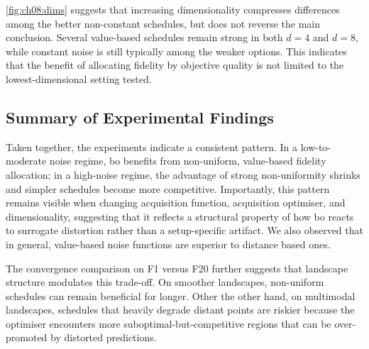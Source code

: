 \cref{fig:ch08:dims} suggests that increasing dimensionality compresses differences among the better non-constant schedules, but does not reverse the main conclusion. Several value-based schedules remain strong in both $d=4$ and $d=8$, while constant noise is still typically among the weaker options. This indicates that the benefit of allocating fidelity by objective quality is not limited to the lowest-dimensional setting tested.

\subsection{Summary of Experimental Findings}
Taken together, the experiments indicate a consistent pattern. In a low-to-moderate noise regime, \gls{bo} benefits from non-uniform, value-based fidelity allocation; in a high-noise regime, the advantage of strong non-uniformity shrinks and simpler schedules become more competitive. Importantly, this pattern remains visible when changing acquisition function, acquisition optimiser, and dimensionality, suggesting that it reflects a structural property of how \gls{bo} reacts to surrogate distortion rather than a setup-specific artifact.
We also observed that in general, value-based noise functions are superior to distance based ones.

The convergence comparison on F1 versus F20 further suggests that landscape structure modulates this trade-off. On smoother landscapes, non-uniform schedules can remain beneficial for longer. Other the other hand, on multimodal landscapes, schedules that heavily degrade distant points are riskier because the optimiser encounters more suboptimal-but-competitive regions that can be over-promoted by distorted predictions.

